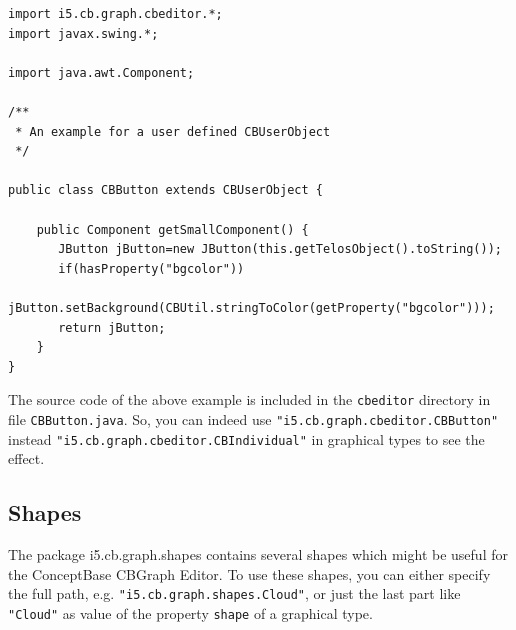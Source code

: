 {\small
\begin{verbatim}
import i5.cb.graph.cbeditor.*;
import javax.swing.*;

import java.awt.Component;

/**
 * An example for a user defined CBUserObject
 */

public class CBButton extends CBUserObject {

    public Component getSmallComponent() {
       JButton jButton=new JButton(this.getTelosObject().toString());
       if(hasProperty("bgcolor"))
          jButton.setBackground(CBUtil.stringToColor(getProperty("bgcolor")));
       return jButton;
    }
}
\end{verbatim}
}

The source code of the above example is included in the {\tt cbeditor} directory in file
{\tt CBButton.java}. So, you can indeed use  {\tt "i5.cb.graph.cbeditor.CBButton"}
instead
{\tt "i5.\-cb.\-graph.\-cbedi\-tor.\-CBIndividual"}
in graphical types to see the effect.



\subsection{Shapes}
\label{sec:shapes}

The package i5.cb.graph.shapes contains several shapes which might
be useful for the ConceptBase CBGraph Editor. To use these shapes, you
can either specify the full path, e.g. {\tt "i5.cb.graph.shapes.Cloud"},
or just the last part like {\tt "Cloud"} as value
of the property {\tt shape} of a graphical type.
\vspace{0.2cm}


